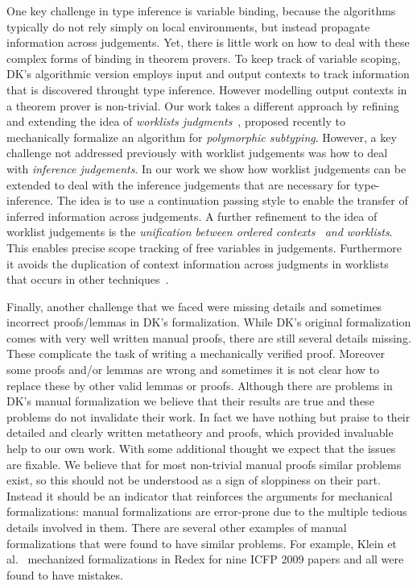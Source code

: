 One key challenge in type inference is variable binding, because the
algorithms typically do not rely simply on local environments, but
instead propagate information across judgements.  Yet, there is little
work on how to deal with these complex forms of binding in theorem
provers. To keep track of variable scoping, DK's algorithmic version
employs input and output contexts to track information that is
discovered throught type inference. However modelling output contexts
in a theorem prover is non-trivial. Our work takes a different
approach by refining and extending the idea of \emph{worklists
  judgments}~\cite{}, proposed recently to mechanically formalize an
algorithm for \emph{polymorphic subtyping}.  However, a key challenge
not addressed previously with worklist judgements was how to deal with
\emph{inference judgements}.  In our work we show how worklist
judgements can be extended to deal with the inference judgements that
are necessary for type-inference.  The idea is to use a continuation
passing style to enable the transfer of inferred information across
judgements. A further refinement to the idea of worklist judgements is
the \emph{unification between ordered contexts~\cite{} and
  worklists}. This enables precise scope tracking of free variables in
judgements. Furthermore it avoids the duplication of context
information across judgments in worklists that occurs in other
techniques~\cite{}.

Finally, another challenge that we faced were missing details and
sometimes incorrect proofs/lemmas in DK's formalization. While DK's
original formalization comes with very well written manual proofs,
there are still several details missing. These complicate the task of
writing a mechanically verified proof. Moreover some proofs and/or
lemmas are wrong and sometimes it is not clear how to replace these by
other valid lemmas or proofs. Although there are problems in DK's manual formalization
we believe that their results are true and these problems do not
invalidate their work. In fact we have nothing but praise to their detailed
and clearly written metatheory and proofs, which provided invaluable
help to our own work.
With some additional thought we expect that the issues
are fixable. We believe that for most non-trivial manual
proofs similar problems exist, so this should not be understood as a sign of sloppiness
on their part. Instead it should be an indicator that reinforces the arguments
for mechanical formalizations: manual formalizations are error-prone due to the multiple
tedious details involved in them.
There are several other examples of manual formalizations that were found to have
similar problems. For example, Klein et al.~\cite{} mechanized formalizations
in Redex for nine ICFP 2009 papers and all were found to have mistakes.

